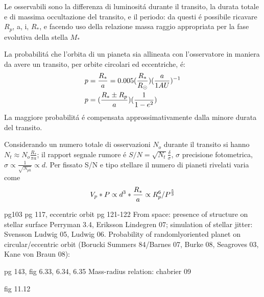 Le osservabili sono la differenza di luminosit\'a durante il transito, la durata totale e di massima occultazione del transito, e il periodo: da questi \'e possibile ricavare $R_p$, a, i, $R_*$, e facendo uso della relazione massa raggio appropriata per la fase evolutiva della stella $M_*$

La probabilit\'a che l'orbita di un pianeta sia allineata con l'osservatore in maniera da avere un transito, per orbite circolari ed eccentriche, \'e:
\begin{align*}
&p=\frac{R_*}{a}=0.005(\frac{R_*}{R_{\odot}{}})(\frac{a}{1AU})^{-1}\\
&p=(\frac{R_*\pm R_p}{a})(\frac{1}{1-e^2})
\end{align*}
La maggiore probabilit\'a \'e compensata approssimativamente dalla minore durata del transito.

\begin{workout}
Considerando un numero totale di osservazioni $N_o$ durante il transito si hanno $N_t\approx N_o\frac{R_*}{\pi a}$; il rapport segnale rumore \'e $S/N=\sqrt{N_t}\frac{\delta}{\sigma}$, $\sigma$ precisione fotometrica, $\sigma\propto\frac{1}{\sqrt{N_{ph}}}\propto d$. Per fissato S/N e tipo stellare il numero di pianeti rivelati varia come
\begin{equation}
V_p*P\propto d^3*\frac{R_*}{a}\propto R_p^6/P^{\frac{5}{3}}
\end{equation}
\end{workout}


\begin{workout}
pg103
pg 117, eccentric orbit pg 121-122
From space: presence of structure on stellar surface Perryman 3.4, Eriksson Lindegren 07; simulation of stellar jitter: Svensson Ludwig 05, Ludwig 06.
Probability of randomlyoriented planet on circular/eccentric orbit (Borucki Summers 84/Barnes 07, Burke 08,  Seagroves 03, Kane von Braun 08):
\end{workout}

\begin{workout}
pg 143, fig 6.33, 6.34, 6.35
Mass-radius relation: chabrier 09
\end{workout}


\begin{workout}
fig 11.12
\end{workout}


